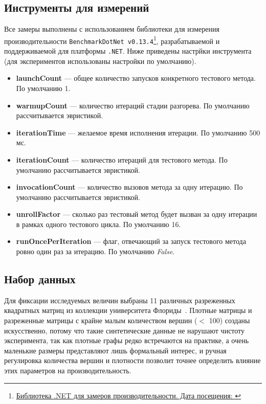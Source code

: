 \subsection{Инструменты для измерений}
\noindent Все замеры выполнены с использованием библиотеки для измерения производительности \texttt{BenchmarkDotNet v0.13.4}\footnote{\href{https://benchmarkdotnet.org/}{Библиотека .NET для замеров производительности. Дата посещения: }}, разрабатываемой и поддерживаемой для платформы \texttt{.NET}. Ниже приведены настрйки инструмента (для экспериментов использованы настройки по умолчанию).
\begin{itemize}[label=--]
    \item{\textbf{launchCount}} --- общее количество запусков конкретного тестового метода. По умолчанию 1.
    \item{\textbf{warmupCount}} --- количество итераций стадии разгорева. По умолчанию рассчитывается эвристикой.
    \item{\textbf{iterationTime}} --- желаемое время исполнения итерации. По умолчанию 500 мс.
    \item{\textbf{iterationCount}} --- количество итераций для тестового метода. По умолчанию рассчитывается эвристикой.
    \item{\textbf{invocationCount}} --- количество вызовов метода за одну итерацию. По умолчанию рассчитывается эвристикой.
    \item{\textbf{unrollFactor}} --- сколько раз тестовый метод будет вызван за одну итерации в рамках одного тестового цикла. По умолчанию 16.
    \item{\textbf{runOncePerIteration}} --- флаг, отвечающий за запуск тестового метода ровно один раз за итерацию. По умолчанию \textit{False}.
\end{itemize}



\subsection{Набор данных}
\noindent Для фиксации исследуемых величин выбраны 11 различных разреженных квадратных матриц из коллекции университета Флориды~\cite{matrixData}. Плотные матрицы и разреженные матрицы с крайне малым количеством вершин ($<$ 100) созданы искусственно, потому что такие синтетические данные не нарушают чистоту эксперимента, так как плотные графы редко встречаются на практике, а очень маленькие размеры представляют лишь формальный интерес, и ручная регулировка количества вершин и плотности позволит точнее определить влияние этих параметров на производительность.

